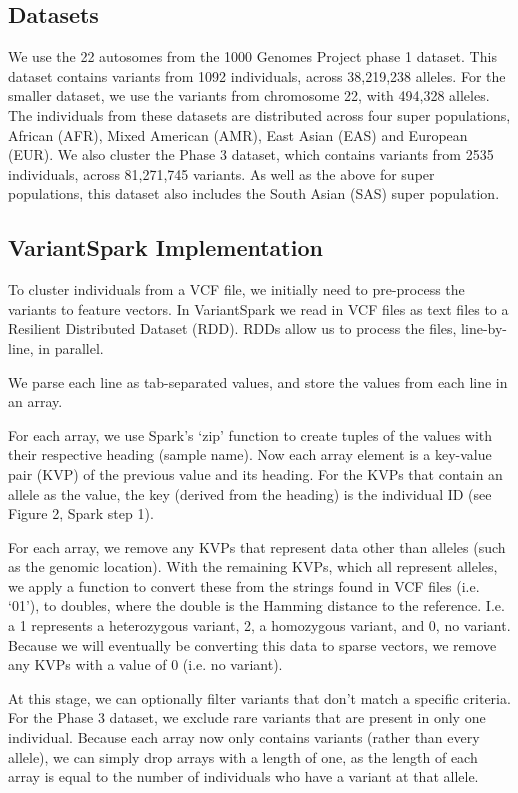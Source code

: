 \documentclass{bmcart}
\newcommand{\variantSpark}{{\sc VariantSpark}}
\begin{document}
\subsection*{Datasets}
We use the 22 autosomes from the 1000 Genomes Project phase 1 dataset. This dataset contains variants from 1092 individuals, across 38,219,238 alleles.
For the smaller dataset, we use the variants from chromosome 22, with 494,328 alleles.
The individuals from these datasets are distributed across four super populations, African (AFR), Mixed American (AMR), East Asian (EAS) and European (EUR).
We also cluster the Phase 3 dataset, which contains variants from 2535 individuals, across 81,271,745 variants. As well as the above for super populations, this
dataset also includes the South Asian (SAS) super population.



\subsection*{VariantSpark Implementation}
To cluster individuals from a VCF file, we initially need to pre-process the variants to feature vectors.
In \variantSpark{} we read in VCF files as text files to a Resilient Distributed Dataset (RDD). RDDs allow us to process the files, line-by-line, in parallel.

We parse each line as tab-separated values, and store the values from each line in an array.

For each array, we use Spark's `zip' function to create tuples of the values with their respective heading (sample name). Now each array element is a
key-value pair (KVP) of the previous value and its heading. For the KVPs that contain an allele as the value, the key (derived from the heading) is
the individual ID (see Figure 2, Spark step 1).

For each array, we remove any KVPs that represent data other than alleles (such as the genomic location). With the remaining KVPs, which all
represent alleles, we apply a function to convert these from the strings found in VCF files (i.e. `0\textbar{}1'), to doubles, where the double is the
Hamming distance to the reference. I.e. a 1 represents a heterozygous variant, 2, a homozygous variant, and 0, no variant. Because we will
eventually be converting this data to sparse vectors, we remove any KVPs with a value of 0 (i.e. no variant).

At this stage, we can optionally filter variants that don't match a specific criteria. For the Phase 3 dataset, we exclude rare variants that are present in
only one individual. Because each array now only contains variants (rather than every allele), we can simply drop arrays with a length of one, as the length
of each array is equal to the number of individuals who have a variant at that allele.
\end{document}
